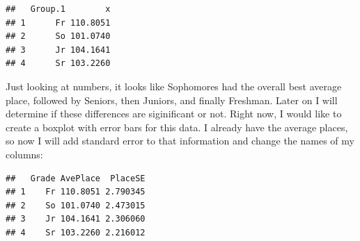 \documentclass[
]{article}
\newenvironment{Shaded}{\begin{snugshade}}{\end{snugshade}}
\newcommand{\ControlFlowTok}[1]{\textcolor[rgb]{0.13,0.29,0.53}{\textbf{#1}}}
\newcommand{\DataTypeTok}[1]{\textcolor[rgb]{0.13,0.29,0.53}{#1}}
\newcommand{\DecValTok}[1]{\textcolor[rgb]{0.00,0.00,0.81}{#1}}
\newcommand{\FloatTok}[1]{\textcolor[rgb]{0.00,0.00,0.81}{#1}}
\newcommand{\KeywordTok}[1]{\textcolor[rgb]{0.13,0.29,0.53}{\textbf{#1}}}
\newcommand{\NormalTok}[1]{#1}
\newcommand{\OperatorTok}[1]{\textcolor[rgb]{0.81,0.36,0.00}{\textbf{#1}}}
\newcommand{\OtherTok}[1]{\textcolor[rgb]{0.56,0.35,0.01}{#1}}
\newcommand{\StringTok}[1]{\textcolor[rgb]{0.31,0.60,0.02}{#1}}
\begin{document}
\begin{Shaded}
\end{Shaded}

\begin{verbatim}
##   Group.1        x
## 1      Fr 110.8051
## 2      So 101.0740
## 3      Jr 104.1641
## 4      Sr 103.2260
\end{verbatim}

Just looking at numbers, it looks like Sophomores had the overall best
average place, followed by Seniors, then Juniors, and finally Freshman.
Later on I will determine if these differences are siginificant or not.
Right now, I would like to create a boxplot with error bars for this
data. I already have the average places, so now I will add standard
error to that information and change the names of my columns:

\begin{Shaded}
\end{Shaded}

\begin{verbatim}
##   Grade AvePlace  PlaceSE
## 1    Fr 110.8051 2.790345
## 2    So 101.0740 2.473015
## 3    Jr 104.1641 2.306060
## 4    Sr 103.2260 2.216012
\end{verbatim}
\end{document}
